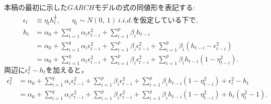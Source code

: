 \documentclass[8pt]{jsarticle}
\begin{document}
\begin{breakbox}
	本稿の最初に示した$GARCH$モデルの式の同値形を表記する:
	\begin{align*}
		\epsilon_t &\equiv \eta_t h_t^{\frac{1}{2}}, \hspace{20pt} \eta_t \sim N(0,\ 1)\ i.i.d. \mbox{を仮定している下で,}\\
		h_t &= \alpha_0 + \sum_{i=1}^{q} \alpha_i \epsilon_{t-i}^2 + \sum_{i=1}^{p} \beta_i h_{t-i} \\
		&= \alpha_0 + \sum_{i=1}^{q} \alpha_i \epsilon_{t-i}^2 + \sum_{i=1}^{p} \beta_i \epsilon_{t-i}^2 + \sum_{i=1}^{p} \beta_i (h_{t-i} - \epsilon_{t-i}^2) \\
		&= \alpha_0 + \sum_{i=1}^{q} \alpha_i \epsilon_{t-i}^2 + \sum_{i=1}^{p} \beta_i \epsilon_{t-i}^2 + \sum_{i=1}^{p} \beta_i h_{t-i}(1 - \eta_{t-i}^2).
	\end{align*}
	$両辺に \epsilon_t^2 - h_t を加えると，$
	\begin{align*}
		\epsilon_t^2 &= \alpha_0 + \sum_{i=1}^{q} \alpha_i \epsilon_{t-i}^2 + \sum_{i=1}^{p} \beta_i \epsilon_{t-i}^2 
			+ \sum_{i=1}^{p} \beta_i h_{t-i}(1 - \eta_{t-i}^2) + \epsilon_t^2 - h_t \\
		&= \alpha_0 + \sum_{i=1}^{q} \alpha_i \epsilon_{t-i}^2 + \sum_{i=1}^{p} \beta_i \epsilon_{t-i}^2 
			+ \sum_{i=1}^{p} \beta_i h_{t-i}(1 - \eta_{t-i}^2) + h_t(\eta_t^2 - 1).
	\end{align*}
\end{breakbox}
\end{document}
